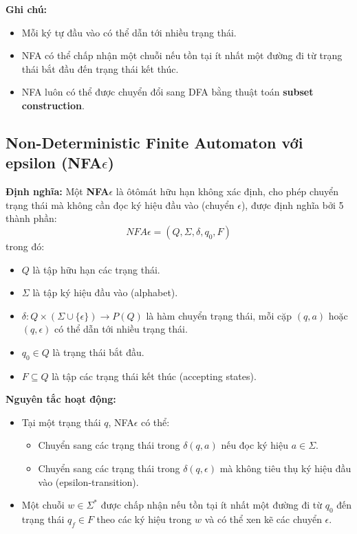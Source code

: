\documentclass[12pt,a4paper]{report}
\begin{document}
\textbf{Ghi chú:}
\begin{itemize}
    \item Mỗi ký tự đầu vào có thể dẫn tới nhiều trạng thái.  
    \item NFA có thể chấp nhận một chuỗi nếu tồn tại ít nhất một đường đi từ trạng thái bắt đầu đến trạng thái kết thúc.  
    \item NFA luôn có thể được chuyển đổi sang DFA bằng thuật toán \textbf{subset construction}.
\end{itemize}

\subsection{Non-Deterministic Finite Automaton với epsilon (NFA$\epsilon$)}
\textbf{Định nghĩa:}  
Một \textbf{NFA$\epsilon$} là ôtômát hữu hạn không xác định, cho phép chuyển trạng thái mà không cần đọc ký hiệu đầu vào (chuyển $\epsilon$), được định nghĩa bởi 5 thành phần:
\[
NFA\epsilon = (Q, \Sigma, \delta, q_0, F)
\]
trong đó:
\begin{itemize}
    \item $Q$ là tập hữu hạn các trạng thái.
    \item $\Sigma$ là tập ký hiệu đầu vào (alphabet).
    \item $\delta: Q \times (\Sigma \cup \{\epsilon\}) \rightarrow P(Q)$ là hàm chuyển trạng thái, mỗi cặp $(q,a)$ hoặc $(q,\epsilon)$ có thể dẫn tới nhiều trạng thái.
    \item $q_0 \in Q$ là trạng thái bắt đầu.
    \item $F \subseteq Q$ là tập các trạng thái kết thúc (accepting states).
\end{itemize}

\textbf{Nguyên tắc hoạt động:}  
\begin{itemize}
    \item Tại một trạng thái $q$, NFA$\epsilon$ có thể:
    \begin{itemize}
        \item Chuyển sang các trạng thái trong $\delta(q, a)$ nếu đọc ký hiệu $a \in \Sigma$.
        \item Chuyển sang các trạng thái trong $\delta(q, \epsilon)$ mà không tiêu thụ ký hiệu đầu vào (epsilon-transition).
    \end{itemize}
    \item Một chuỗi $w \in \Sigma^*$ được chấp nhận nếu tồn tại ít nhất một đường đi từ $q_0$ đến trạng thái $q_f \in F$ theo các ký hiệu trong $w$ và có thể xen kẽ các chuyển $\epsilon$.
\end{itemize}
\end{document}

